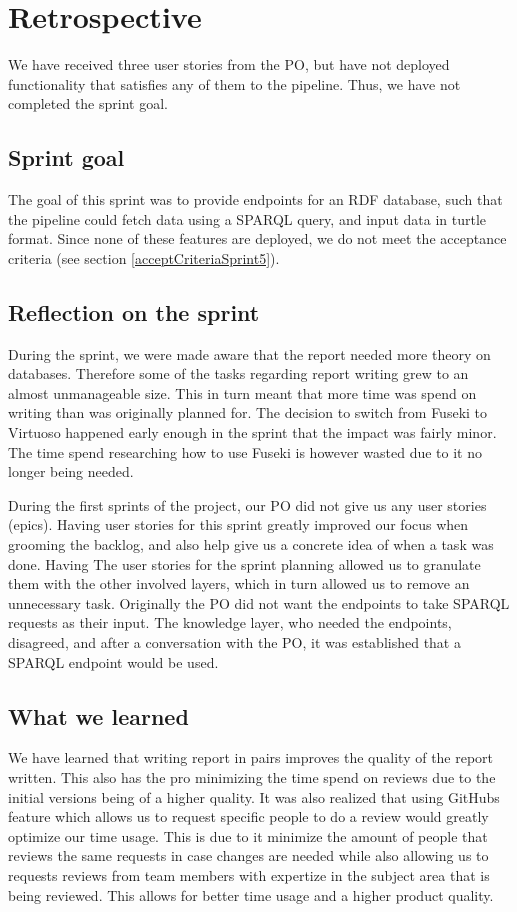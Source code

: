 \section{Retrospective}
We have received three user stories from the PO, but have not deployed functionality that satisfies any of them to the \knox{} pipeline. Thus, we have not completed the sprint goal.

\subsection{Sprint goal}
The goal of this sprint was to provide endpoints for an RDF database, such that the \knox{} pipeline could fetch data using a SPARQL query, and input data in turtle format.
Since none of these features are deployed, we do not meet the acceptance criteria (see section \ref{acceptCriteriaSprint5}).

\subsection{Reflection on the sprint}
During the sprint, we were made aware that the report needed more theory on databases. 
Therefore some of the tasks regarding report writing grew to an almost unmanageable size. This in turn meant that more time was spend on writing than was originally planned for.
The decision to switch from Fuseki to Virtuoso happened early enough in the sprint that the impact was fairly minor. The time spend researching how to use Fuseki is however wasted due to it no longer being needed.

During the first sprints of the project, our PO did not give us any user stories (epics). Having user stories for this sprint greatly improved our focus when grooming the backlog, and also help give us a concrete idea of when a task was done. 
Having The user stories for the sprint planning allowed us to granulate them with the other involved layers, which in turn allowed us to remove an unnecessary task. Originally the PO did not want the endpoints to take SPARQL requests as their input.
The knowledge layer, who needed the endpoints, disagreed, and after a conversation with the PO, it was established that a SPARQL endpoint would be used.

\subsection{What we learned}
We have learned that writing report in pairs improves the quality of the report written. This also has the pro minimizing the time spend on reviews due to the initial versions being of a higher quality.
It was also realized that using GitHubs feature which allows us to request specific people to do a review would greatly optimize our time usage. This is due to it minimize the amount of people that reviews the same requests in case changes are needed while also allowing us to requests reviews from team members with expertize in the subject area that is being reviewed. This allows for better time usage and a higher product quality. 

